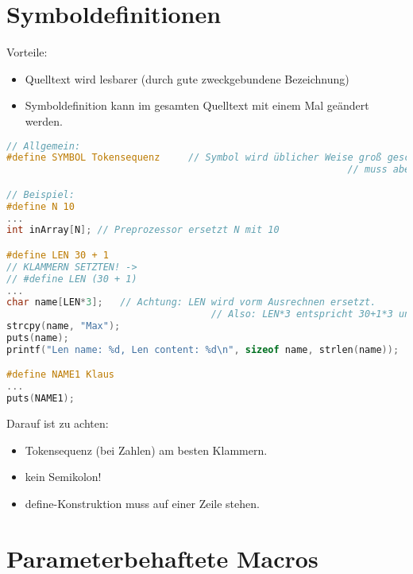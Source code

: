 \section{Symboldefinitionen}
Vorteile:
\begin{itemize}
\item Quelltext wird lesbarer (durch gute zweckgebundene Bezeichnung)
\item Symboldefinition kann im gesamten Quelltext mit einem Mal geändert werden.
\end{itemize}
\begin{lstlisting}[language = C]
// Allgemein:
#define SYMBOL Tokensequenz		// Symbol wird üblicher Weise groß geschrieben,
															// muss aber nicht (nur zur besseren Wiedererkennung).

// Beispiel:
#define N 10
...
int inArray[N];	// Preprozessor ersetzt N mit 10

#define LEN 30 + 1
// KLAMMERN SETZTEN! ->
// #define LEN (30 + 1)
...
char name[LEN*3];	// Achtung: LEN wird vorm Ausrechnen ersetzt. 
									// Also: LEN*3 entspricht 30+1*3 und nicht (30+1)*3
strcpy(name, "Max");
puts(name);
printf("Len name: %d, Len content: %d\n", sizeof name, strlen(name));

#define NAME1 Klaus
...
puts(NAME1);
\end{lstlisting}

Darauf ist zu achten:
\begin{itemize}
\item Tokensequenz (bei Zahlen) am besten Klammern.
\item kein Semikolon!
\item define-Konstruktion muss auf einer Zeile stehen.
\end{itemize}

\section{Parameterbehaftete Macros}

